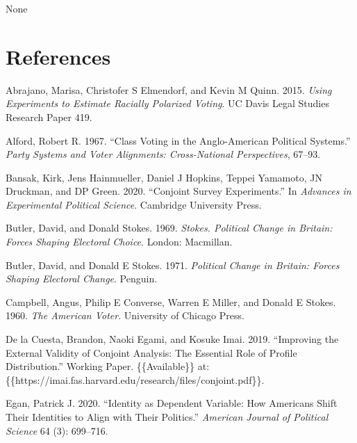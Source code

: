 \documentclass[a4paper]{cupjournal}
\newenvironment{CSLReferences}%
  {}%
  {\par}
\begin{document}
None

\hypertarget{references}{%
\section*{References}\label{references}}

\hypertarget{refs}{}
\begin{CSLReferences}{1}{0}
\leavevmode{}%
Abrajano, Marisa, Christofer S Elmendorf, and Kevin M Quinn. 2015. \emph{Using Experiments to Estimate Racially Polarized Voting}. {UC Davis Legal Studies Research Paper 419}.

\leavevmode{}%
Alford, Robert R. 1967. {``Class Voting in the {Anglo-American} Political Systems.''} \emph{Party Systems and Voter Alignments: Cross-National Perspectives}, 67--93.

\leavevmode{}%
Bansak, Kirk, Jens Hainmueller, Daniel J Hopkins, Teppei Yamamoto, JN Druckman, and DP Green. 2020. {``Conjoint Survey Experiments.''} In \emph{Advances in {Experimental Political Science}}. {Cambridge University Press}.

\leavevmode{}%
Butler, David, and Donald Stokes. 1969. \emph{Stokes. {Political Change} in {Britain}: {Forces Shaping Electoral Choice}}. {London: Macmillan}.

\leavevmode{}%
Butler, David, and Donald E Stokes. 1971. \emph{Political {Change} in {Britain}: {Forces Shaping Electoral Change}}. {Penguin}.

\leavevmode{}%
Campbell, Angus, Philip E Converse, Warren E Miller, and Donald E Stokes. 1960. \emph{The American Voter}. {University of Chicago Press}.

\leavevmode{}%
De la Cuesta, Brandon, Naoki Egami, and Kosuke Imai. 2019. {``Improving the {External Validity} of {Conjoint Analysis}: {The Essential Role} of {Profile Distribution}.''} Working Paper. \{\{Available\}\} at: \{\{https://imai.fas.harvard.edu/research/files/conjoint.pdf\}\}.

\leavevmode{}%
Egan, Patrick J. 2020. {``Identity as Dependent Variable: {How Americans} Shift Their Identities to Align with Their Politics.''} \emph{American Journal of Political Science} 64 (3): 699--716.


\end{CSLReferences}
\end{document}
